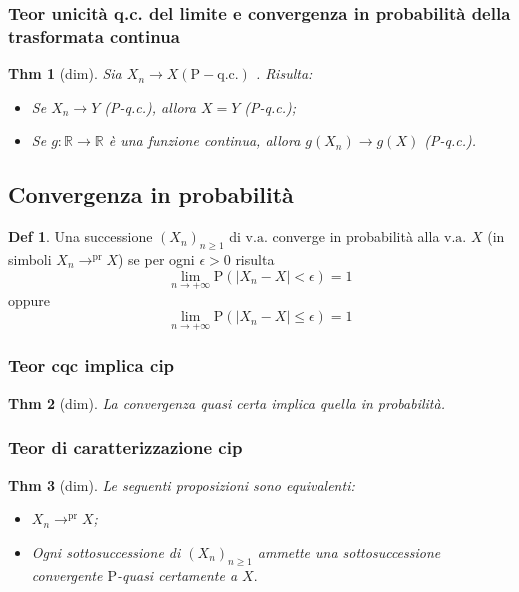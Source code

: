 \documentclass[a4paper,11pt]{article}
\theoremstyle{plain}
\newtheorem{thm}{Thm}[section]
\theoremstyle{definition}
\newtheorem{defn}{Def}[section]
\theoremstyle{remark}
\begin{document}
\subsubsection{Teor unicità q.c. del limite e convergenza in probabilità della trasformata continua}
\begin{thm}[dim]
Sia $X_{n}\rightarrow X (\mathrm{P}- \mathrm{q}.\mathrm{c}.)$ . Risulta:
\begin{itemize}
    \item Se $X_{n}\rightarrow Y$ (P-q.c.), allora $X=Y$ (P-q.c.);
    \item Se $g:\mathbb{R}\rightarrow \mathbb{R}$ è una funzione continua, allora $g(X_{n})\rightarrow g(X)$ (P-q.c.).
\end{itemize}
\end{thm}

\subsection{Convergenza in probabilità}
\begin{defn}
Una successione $(X_{n})_{n\geq 1}$ di $\mathrm{v}.\mathrm{a}$. converge in probabilità alla $\mathrm{v}.\mathrm{a}.$ $X$ (in simboli $X_{n}\rightarrow^{\mathrm{p}\mathrm{r}}X$) se per ogni $\epsilon>0$ risulta\\ $$\displaystyle \lim_{n\rightarrow+\infty}\mathrm{P}(|X_{n}-X|<\epsilon)=1$$
oppure
$$
\lim_{n\rightarrow+\infty}\mathrm{P}(|X_{n}-X|\leq\epsilon)=1
$$
\end{defn}

\subsubsection{Teor cqc implica cip}
\begin{thm}[dim]
La convergenza quasi certa implica quella in probabilità.
\end{thm}

\subsubsection{Teor di caratterizzazione cip}
\begin{thm}[dim] Le seguenti proposizioni sono equivalenti: 
\begin{itemize}
\item [i)] $X_{n}\rightarrow^{\mathrm{p}\mathrm{r}}X$;
\item [ii)] Ogni sottosuccessione di $(X_{n})_{n\geq 1}$ ammette una sottosuccessione convergente $\mathrm{P}$-quasi certamente a $X.$
\end{itemize}
\end{thm}
\end{document}
